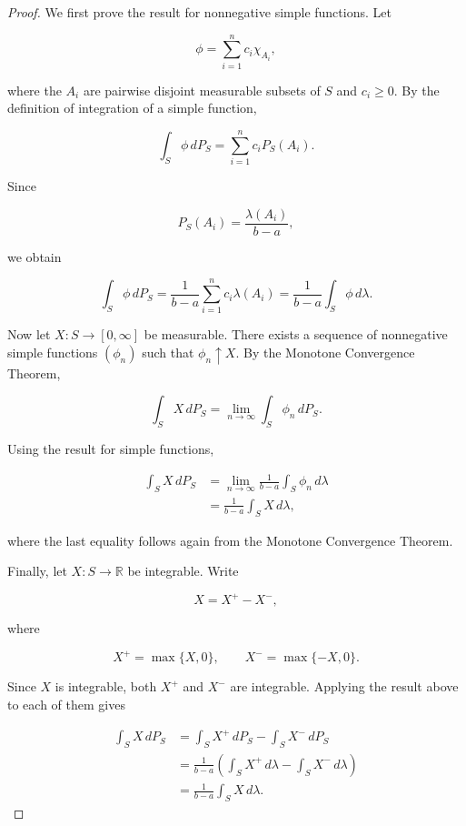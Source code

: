 \documentclass[10pt,a4paper]{book}
\begin{document}
\begin{proof}

    We first prove the result for nonnegative simple functions. Let

    $$
        \phi=\sum_{i=1}^n c_i \chi_{A_i},
    $$

    where the $A_i$ are pairwise disjoint measurable subsets of $S$ and $c_i\geq0$. By the definition of integration of a simple function,

    $$
        \int_S\phi\,dP_S
        =
        \sum_{i=1}^n c_iP_S(A_i).
    $$

    Since

    $$
        P_S(A_i)=\frac{\lambda(A_i)}{b-a},
    $$

    we obtain

    $$
        \int_S\phi\,dP_S
        =
        \frac{1}{b-a}\sum_{i=1}^n c_i\lambda(A_i)
        =
        \frac{1}{b-a}\int_S\phi\,d\lambda.
    $$

    Now let $X:S\to[0,\infty]$ be measurable. There exists a sequence of nonnegative simple functions $(\phi_n)$ such that $\phi_n\uparrow X$. By the Monotone Convergence Theorem,

    $$
        \int_S X\,dP_S
        =
        \lim_{n\to\infty}\int_S\phi_n\,dP_S.
    $$

    Using the result for simple functions,

    $$
        \begin{aligned}
            \int_S X\,dP_S
             & =
            \lim_{n\to\infty}
            \frac{1}{b-a}\int_S\phi_n\,d\lambda \\
             & =
            \frac{1}{b-a}\int_S X\,d\lambda,
        \end{aligned}
    $$

    where the last equality follows again from the Monotone Convergence Theorem.

    Finally, let $X:S\to\mathbb R$ be integrable. Write

    $$
        X=X^+-X^-,
    $$

    where

    $$
        X^+=\max\{X,0\},
        \qquad
        X^-=\max\{-X,0\}.
    $$

    Since $X$ is integrable, both $X^+$ and $X^-$ are integrable. Applying the result above to each of them gives

    $$
        \begin{aligned}
            \int_S X\,dP_S
             & =
            \int_S X^+\,dP_S-\int_S X^-\,dP_S \\
             & =
            \frac{1}{b-a}
            \left(
            \int_S X^+\,d\lambda
            -
            \int_S X^-\,d\lambda
            \right)                           \\
             & =
            \frac{1}{b-a}\int_S X\,d\lambda.
        \end{aligned}
    $$


\end{proof}
\end{document}
